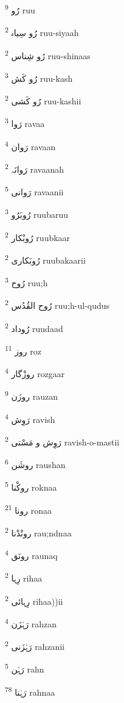 \documentclass[12pt]{article}
\begin{document}
\begin{RTL}
\begin{multicols}{5}
{\ur رُو}   \textsuperscript{9} ruu

{\ur رُو سِیاہ}   \textsuperscript{2} ruu-siyaah

{\ur رُو شِناس}   \textsuperscript{2} ruu-shinaas

{\ur رُو کَش}   \textsuperscript{3} ruu-kash

{\ur رُو کَشی}   \textsuperscript{2} ruu-kashii

{\ur رَوا}   \textsuperscript{3} ravaa

{\ur رَوان}   \textsuperscript{4} ravaan

{\ur رَوانَہ}   \textsuperscript{2} ravaanah

{\ur رَوانی}   \textsuperscript{5} ravaanii

{\ur رُوبَرُو}   \textsuperscript{3} ruubaruu

{\ur رُوبْکار}   \textsuperscript{2} ruubkaar

{\ur رُوبَکاری}   \textsuperscript{2} ruubakaarii

{\ur رُوح}   \textsuperscript{3} ruu;h

{\ur رُوح القُدُس}   \textsuperscript{2} ruu;h-ul-qudus

{\ur رُوداد}   \textsuperscript{2} ruudaad

{\ur روز}   \textsuperscript{11} roz

{\ur روزْگار}   \textsuperscript{4} rozgaar

{\ur روزَن}   \textsuperscript{9} rauzan

{\ur رَوِش}   \textsuperscript{4} ravish

{\ur رَوِش و مَسْتی}   \textsuperscript{2} ravish-o-mastii

{\ur روشَن}   \textsuperscript{6} raushan

{\ur روکْنا}   \textsuperscript{5} roknaa

{\ur رونا}   \textsuperscript{21} ronaa

{\ur رونْدْنا}   \textsuperscript{2} rau;ndnaa

{\ur رونَق}   \textsuperscript{4} raunaq

{\ur رِہا}   \textsuperscript{2} rihaa

{\ur رِہائی}   \textsuperscript{2} rihaa))ii

{\ur رَہْزَن}   \textsuperscript{4} rahzan

{\ur رَہْزَنی}   \textsuperscript{2} rahzanii

{\ur رَہْن}   \textsuperscript{5} rahn

{\ur رَہْنا}   \textsuperscript{78} rahnaa


\end{multicols}
\end{RTL}
\end{document}
